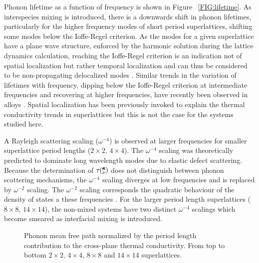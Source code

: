 \documentclass[aps,prb,preprint,preprintnumbers,amsmath,amssymb,floatfix,superscriptaddress]{revtex4}
\newcommand{\kv}{\mspace{-4.0mu}\left(\mspace{-8.0mu}
\begin{smallmatrix}&\pmb{\kappa} \\&\nu\end{smallmatrix}
\mspace{-3.0mu}\right)}
\begin{document}
Phonon lifetime as a function of frequency is shown in Figure ~\ref{FIG:lifetime}. As interspecies mixing is introduced, there is a downwards shift in phonon lifetimes, particularly for the higher frequency modes of short period superlattices, shifting some modes below the Ioffe-Regel criterion. As the modes for a given superlattice have a plane wave structure, enforced by the harmonic solution during the lattice dynamics calculation, reaching the Ioffe-Regel criterion is an indication not of spatial localization but rather temporal localization and can thus be considered to be non-propagating delocalized modes \cite{allen_thermal_1993}. Similar trends in the variation of lifetimes with frequency, dipping below the Ioffe-Regel criterion at intermediate frequencies and recovering at higher frequencies, have recently been observed in alloys \cite{jason2013vc}. Spatial localization has been previously invoked to explain the thermal conductivity trends in superlattices \cite{PhysRevB.61.3091} but this is not the case for the systems studied here.

A Rayleigh scattering scaling ($\omega^{-4}$) is observed at larger frequencies for smaller superlattice period lengths ($2\times2$, $4\times4$). The $\omega^{-4}$ scaling was theoretically predicted to dominate long wavelength modes due to elastic defect scattering\cite{PhysRev.140.A1812,klemens_scattering_1955-3, klemens_thermal_1957-2}. Because the determination of $\tau\kv$ does not distinguish between phonon scattering mechanisms, the $\omega^{-4}$ scaling diverges at low frequencies and is replaced by $\omega^{-2}$ scaling. The $\omega^{-2}$ scaling corresponds the quadratic behaviour of the density of states a these frequencies \cite{Klemens_Thermal_1951}. For the larger period length superlattices ($8\times8$, $14\times14$), the non-mixed systems have two distinct $\omega^{-4}$ scalings which become smeared as interfacial mixing is introduced.

\begin{figure}%
\begin{center}
\renewcommand{\figure}{Fig.}
\caption{Phonon mean free path normalized by the period length contribution to the cross-plane thermal conductivity. From top to bottom $2\times2$, $4\times4$, $8\times8$ and $14\times14$ superlattices.}
\label{FIG:MFP_cp}
\end{center}
\end{figure}
\end{document}

